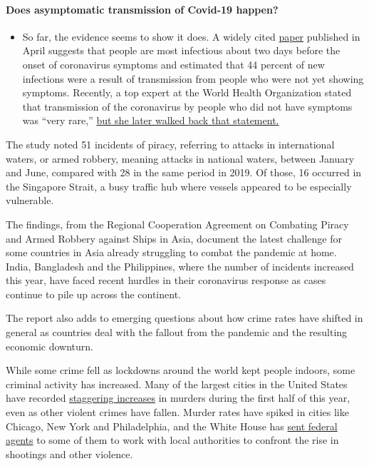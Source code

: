 \begin{itemize}
{  \paragraph{Does asymptomatic transmission of Covid-19
  happen?}\label{does-asymptomatic-transmission-of-covid-19-happen}}

  \begin{itemize}
  \tightlist
  \item
    So far, the evidence seems to show it does. A widely cited
    \href{https://www.nature.com/articles/s41591-020-0869-5}{paper}
    published in April suggests that people are most infectious about
    two days before the onset of coronavirus symptoms and estimated that
    44 percent of new infections were a result of transmission from
    people who were not yet showing symptoms. Recently, a top expert at
    the World Health Organization stated that transmission of the
    coronavirus by people who did not have symptoms was ``very rare,''
    \href{https://www.nytimes3xbfgragh.onion/2020/06/09/world/coronavirus-updates.html?action=click\&pgtype=Article\&state=default\&module=styln-coronavirus-national\&region=MAIN_CONTENT_3\&context=storylines_faq\#link-1f302e21}{but
    she later walked back that statement.}
  \end{itemize}
\end{itemize}

The study noted 51 incidents of piracy, referring to attacks in
international waters, or armed robbery, meaning attacks in national
waters, between January and June, compared with 28 in the same period in
2019. Of those, 16 occurred in the Singapore Strait, a busy traffic hub
where vessels appeared to be especially vulnerable.

The findings, from the Regional Cooperation Agreement on Combating
Piracy and Armed Robbery against Ships in Asia, document the latest
challenge for some countries in Asia already struggling to combat the
pandemic at home. India, Bangladesh and the Philippines, where the
number of incidents increased this year, have faced recent hurdles in
their coronavirus response as cases continue to pile up across the
continent.

The report also adds to emerging questions about how crime rates have
shifted in general as countries deal with the fallout from the pandemic
and the resulting economic downturn.

While some crime fell as lockdowns around the world kept people indoors,
some criminal activity has increased. Many of the largest cities in the
United States have recorded
\href{https://www.nytimes3xbfgragh.onion/2020/07/06/upshot/murders-rising-crime-coronavirus.html}{staggering
increases} in murders during the first half of this year, even as other
violent crimes have fallen. Murder rates have spiked in cities like
Chicago, New York and Philadelphia, and the White House has
\href{https://www.nytimes3xbfgragh.onion/2020/07/22/us/politics/trump-federal-agents-cities.html}{sent
federal agents} to some of them to work with local authorities to
confront the rise in shootings and other violence.

